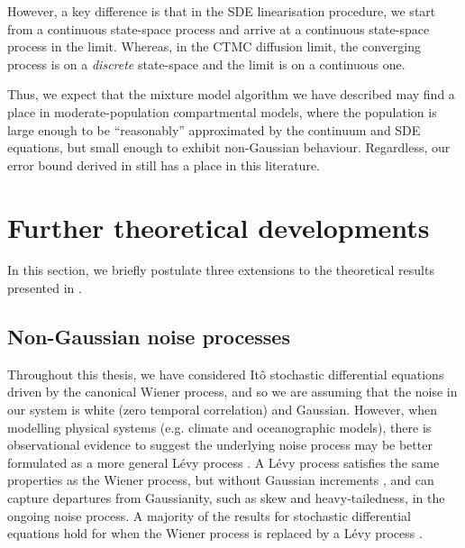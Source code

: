 However, a key difference is that in the SDE linearisation procedure, we start from a continuous state-space process and arrive at a continuous state-space process in the limit.
Whereas, in the CTMC diffusion limit, the converging process is on a \emph{discrete} state-space and the limit is on a continuous one.




Thus, we expect that the mixture model algorithm we have described may find a place in moderate-population compartmental models, where the population is large enough to be ``reasonably'' approximated by the continuum and SDE equations, but small enough to exhibit non-Gaussian behaviour.
Regardless, our error bound derived in  still has a place in this literature.





\section{Further theoretical developments}
In this section, we briefly postulate three extensions to the theoretical results presented in .



\subsection{Non-Gaussian noise processes}\label{sec:disc_levy}
Throughout this thesis, we have considered It\^o stochastic differential equations driven by the canonical Wiener process, and so we are assuming that the noise in our system is white (zero temporal correlation) and Gaussian.
However, when modelling physical systems (e.g. climate and oceanographic models), there is observational evidence to suggest the underlying noise process may be better formulated as a more general L\'evy process \citep{Ditlevsen_1999_ObservationAstableNoise, Viecelli_1998_PossibilitySingularLowFrequency}.
A L\'evy process satisfies the same properties as the Wiener process, but without Gaussian increments \citep{Applebaum_2004_LevyProcessesStochastic}, and can capture departures from Gaussianity, such as skew and heavy-tailedness, in the ongoing noise process.
A majority of the results for stochastic differential equations hold for when the Wiener process is replaced by a L\'evy process \citep{Applebaum_2004_LevyProcessesStochastic}.

